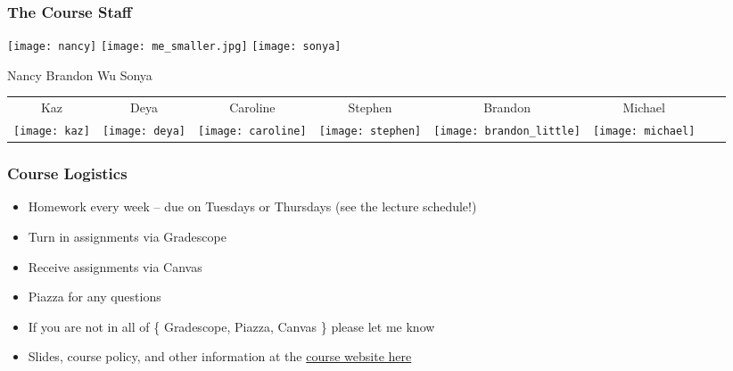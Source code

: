 \documentclass[aspectratio=169, handout]{beamer}
\begin{document}
\begin{frame}[fragile]
    \frametitle{The Course Staff}

    \begin{center}
      \texttt{[image: nancy]} \qquad \qquad \qquad
      \texttt{[image: me\_smaller.jpg]} \qquad \qquad \qquad
      \texttt{[image: sonya]}
    \end{center}
    \begin{center}
      \large Nancy \qquad \qquad \quad
      \Large Brandon Wu \qquad \qquad \quad
      \large Sonya
    \end{center}

    \vspace{\fill}

    \begin{center}\begin{tabular}{c c c c c c c c }
      Kaz & Deya & Caroline & Stephen & Brandon & Michael \\
      \texttt{[image: kaz]} &
      \texttt{[image: deya]} &
      \texttt{[image: caroline]} &
      \texttt{[image: stephen]} &
      \texttt{[image: brandon\_little]} &
      \texttt{[image: michael]} \\
    \end{tabular}\end{center}
\end{frame}

\begin{frame}[fragile]
  \frametitle{Course Logistics}

  \begin{itemize}
    \item Homework every week -- due on Tuesdays or Thursdays (see the lecture schedule!)
    \item Turn in assignments via Gradescope
    \item Receive assignments via Canvas
    \item Piazza for any questions
    \item If you are not in all of \{ Gradescope, Piazza, Canvas \} please let me know
    \item Slides, course policy, and other information at the {\color{blue}\href{http://www.cs.cmu.edu/~15150/}{course website here}}
  \end{itemize}
\end{frame}
\end{document}
